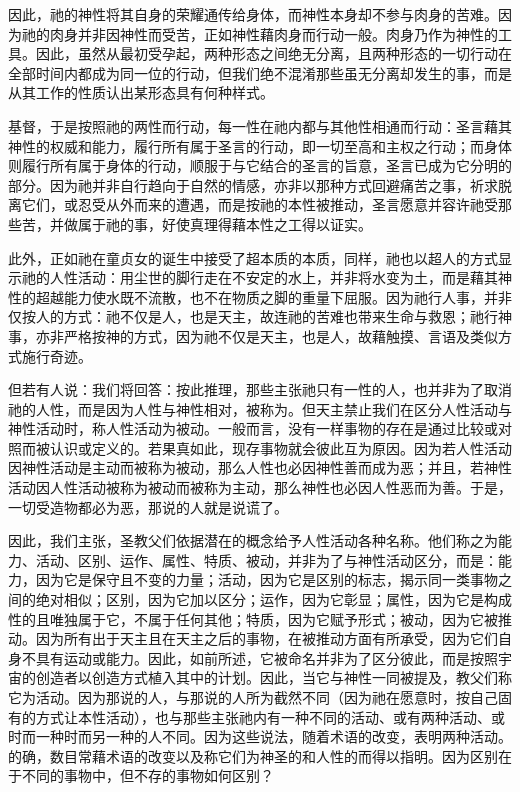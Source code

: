 因此，祂的神性将其自身的荣耀通传给身体，而神性本身却不参与肉身的苦难。因为祂的肉身并非因神性而受苦，正如神性藉肉身而行动一般。肉身乃作为神性的工具。因此，虽然从最初受孕起，两种形态之间绝无分离，且两种形态的一切行动在全部时间内都成为同一位的行动，但我们绝不混淆那些虽无分离却发生的事，而是从其工作的性质认出某形态具有何种样式。\par

基督，于是按照祂的两性而行动，每一性在祂内都与其他性相通而行动：圣言藉其神性的权威和能力，履行所有属于圣言的行动，即一切至高和主权之行动；而身体则履行所有属于身体的行动，顺服于与它结合的圣言的旨意，圣言已成为它分明的部分。因为祂并非自行趋向于自然的情感，亦非以那种方式回避痛苦之事，祈求脱离它们，或忍受从外而来的遭遇，而是按祂的本性被推动，圣言愿意并容许祂受那些苦，并做属于祂的事，好使真理得藉本性之工得以证实。\par

此外，正如祂在童贞女的诞生中接受了超本质的本质，同样，祂也以超人的方式显示祂的人性活动：用尘世的脚行走在不安定的水上，并非将水变为土，而是藉其神性的超越能力使水既不流散，也不在物质之脚的重量下屈服。因为祂行人事，并非仅按人的方式：祂不仅是人，也是天主，故连祂的苦难也带来生命与救恩；祂行神事，亦非严格按神的方式，因为祂不仅是天主，也是人，故藉触摸、言语及类似方式施行奇迹。\par

但若有人说：我们将回答：按此推理，那些主张祂只有一性的人，也并非为了取消祂的人性，而是因为人性与神性相对，被称为。但天主禁止我们在区分人性活动与神性活动时，称人性活动为被动。一般而言，没有一样事物的存在是通过比较或对照而被认识或定义的。若果真如此，现存事物就会彼此互为原因。因为若人性活动因神性活动是主动而被称为被动，那么人性也必因神性善而成为恶；并且，若神性活动因人性活动被称为被动而被称为主动，那么神性也必因人性恶而为善。于是，一切受造物都必为恶，那说的人就是说谎了。\par

因此，我们主张，圣教父们依据潜在的概念给予人性活动各种名称。他们称之为能力、活动、区别、运作、属性、特质、被动，并非为了与神性活动区分，而是：能力，因为它是保守且不变的力量；活动，因为它是区别的标志，揭示同一类事物之间的绝对相似；区别，因为它加以区分；运作，因为它彰显；属性，因为它是构成性的且唯独属于它，不属于任何其他；特质，因为它赋予形式；被动，因为它被推动。因为所有出于天主且在天主之后的事物，在被推动方面有所承受，因为它们自身不具有运动或能力。因此，如前所述，它被命名并非为了区分彼此，而是按照宇宙的创造者以创造方式植入其中的计划。因此，当它与神性一同被提及，教父们称它为活动。因为那说的人，与那说的人所为截然不同（因为祂在愿意时，按自己固有的方式让本性活动），也与那些主张祂内有一种不同的活动、或有两种活动、或时而一种时而另一种的人不同。因为这些说法，随着术语的改变，表明两种活动。的确，数目常藉术语的改变以及称它们为神圣的和人性的而得以指明。因为区别在于不同的事物中，但不存的事物如何区别？\par

